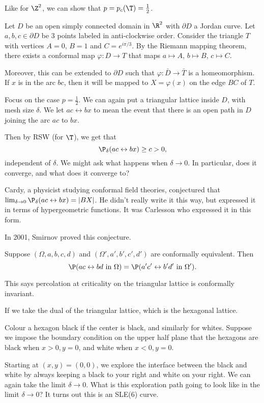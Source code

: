 \documentclass[a4paper]{article}
\begin{document}
Like for $\Z^2$, we can show that $p = p_c(\T) = \frac{1}{2}$.

Let $D$ be an open simply connected domain in $\R^2$ with $\partial D$ a Jordan curve. Let $a, b, c \in \partial D$ be $3$ points labeled in anti-clockwise order. Consider the triangle $T$ with vertices $A = 0$, $B = 1$ and $C = e^{i\pi/3}$. By the Riemann mapping theorem, there exists a conformal map $\varphi: D \to T$ that maps $a \mapsto A$, $b \mapsto B$, $c \mapsto C$.

Moreover, this can be extended to $\partial D$ such that $\varphi: \bar{D} \to \bar{T}$ is a homeomorphism. If $x$ is in the arc $bc$, then it will be mapped to $X = \varphi(x)$ on the edge $BC$ of $T$.

Focus on the case $p = \frac{1}{2}$. We can again put a triangular lattice inside $D$, with mesh size $\delta$. We let $ac \leftrightarrow bx$ to mean the event that there is an open path in $D$ joining the arc $ac$ to $bx$.

Then by RSW (for $\T$), we get that
\[
  \P_\delta(ac \leftrightarrow bx) \geq c > 0,
\]
independent of $\delta$. We might ask what happens when $\delta \to 0$. In particular, does it converge, and what does it converge to?

Cardy, a physicist studying conformal field theories, conjectured that $\lim_{\delta \to 0} \P_\delta(ac \leftrightarrow bx) = |BX|$. He didn't really write it this way, but expressed it in terms of hypergeometric functions. It was Carlesson who expressed it in this form.

In 2001, Smirnov proved this conjecture.

\begin{thm}[Smirnov, 2001]
  Suppose $(\Omega, a, b, c, d)$ and $(\Omega', a', b', c', d')$ are conformally equivalent. Then
  \[
    \P(ac \leftrightarrow bd\text{ in }\Omega) = \P(a' c' \leftrightarrow b' d'\text{ in }\Omega').
  \]
\end{thm}
This says percolation at criticality on the triangular lattice is conformally invariant.

If we take the dual of the triangular lattice, which is the hexagonal lattice. %

Colour a hexagon black if the center is black, and similarly for whites. Suppose we impose the boundary condition on the upper half plane that the hexagons are black when $x > 0, y = 0$, and white when $x < 0, y = 0$.

Starting at $(x, y) = (0, 0)$, we explore the interface between the black and white by always keeping a black to your right and white on your right. We can again take the limit $\delta \to 0$. What is this exploration path going to look like in the limit $\delta \to 0$? It turns out this is an SLE(6) curve.
\end{document}
